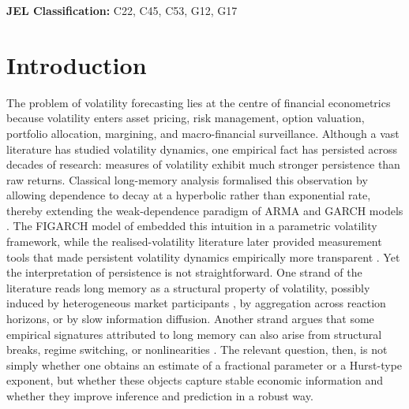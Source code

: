 \documentclass[11pt,a4paper]{article}
\begin{document}
\noindent\textbf{JEL Classification:} C22, C45, C53, G12, G17

\newpage


\section{Introduction}
\label{sec:intro}

The problem of volatility forecasting lies at the centre of financial
econometrics because volatility enters asset pricing, risk management,
option valuation, portfolio allocation, margining, and macro-financial
surveillance. Although a vast literature has studied volatility dynamics,
one empirical fact has persisted across decades of research: measures of
volatility exhibit much stronger persistence than raw returns. Classical
long-memory analysis formalised this observation by allowing dependence to
decay at a hyperbolic rather than exponential rate, thereby extending the
weak-dependence paradigm of ARMA and GARCH models
\citep{granger1980introduction,hosking1981fractional,ding1993long}. The
FIGARCH model of \citet{baillie1996fractionally} embedded this intuition in
a parametric volatility framework, while the realised-volatility literature
later provided measurement tools that made persistent volatility dynamics
empirically more transparent \citep{andersen2003modeling,
barndorff2002econometric,corsi2009simple}. Yet the interpretation of
persistence is not straightforward. One strand of the literature reads
long memory as a structural property of volatility, possibly induced by
heterogeneous market participants \citep{muller1997volatilities}, by
aggregation across reaction horizons, or by slow information diffusion.
Another strand argues that some empirical signatures attributed to long
memory can also arise from structural breaks, regime switching, or
nonlinearities \citep{mikosch2004nonstationarities,gatheral2018volatility}.
The relevant question, then, is not simply whether one obtains an estimate
of a fractional parameter or a Hurst-type exponent, but whether these
objects capture stable economic information and whether they improve
inference and prediction in a robust way.
\end{document}
